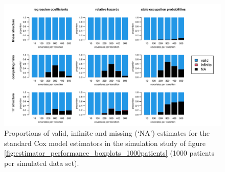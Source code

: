     \begin{figure}[h] 
    \centering         
    \includegraphics[width=14.5cm, angle=0]{figures/na_props_1000patients_coxph.pdf} %
    \vspace*{0.25cm}     %
    \caption{Proportions of valid, infinite and missing (`NA') estimates for the standard Cox model estimators in the simulation study of figure \ref{fig:estimator_performance_boxplots_1000patients} (1000 patients per simulated data set).}
    \label{fig:na_props_1000patients_coxph} %
    \end{figure}
    
